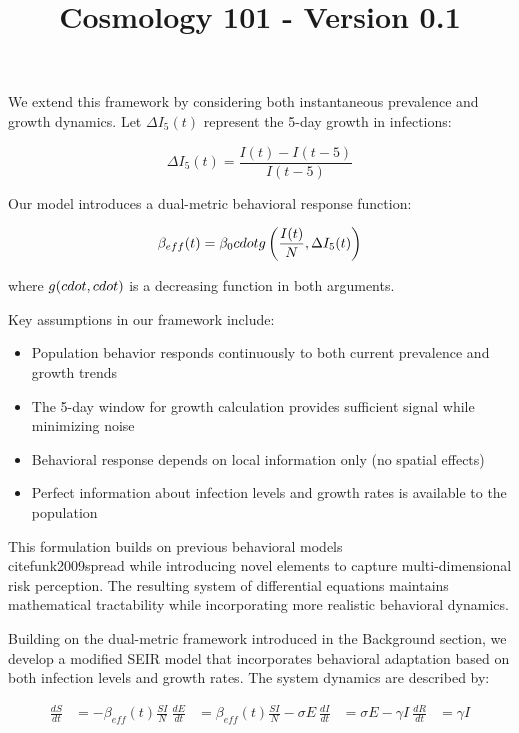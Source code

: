 \documentclass{article}\usepackage{graphicx} \usepackage{amsmath} \usepackage{colortbl}\title{Cosmology 101 - Version 0.1}
\begin{document}
We extend this framework by considering both instantaneous prevalence and growth dynamics. Let $\Delta I_5(t)$ represent the 5-day growth in infections:

\begin{equation}
\Delta I_5(t) = \frac{I(t) - I(t-5)}{I(t-5)}
\end{equation}

Our model introduces a dual-metric behavioral response function:

\begin{equation}
\beta_{eff}(t) = \beta_0 \\cdot g\left(\frac{I(t)}{N}, \Delta I_5(t)\right)
\end{equation}

where $g(\\cdot,\\cdot)$ is a decreasing function in both arguments.

Key assumptions in our framework include:
\begin{itemize}
    \item Population behavior responds continuously to both current prevalence and growth trends
    \item The 5-day window for growth calculation provides sufficient signal while minimizing noise
    \item Behavioral response depends on local information only (no spatial effects)
    \item Perfect information about infection levels and growth rates is available to the population
\end{itemize}

This formulation builds on previous behavioral models \\cite{funk2009spread} while introducing novel elements to capture multi-dimensional risk perception. The resulting system of differential equations maintains mathematical tractability while incorporating more realistic behavioral dynamics.

Building on the dual-metric framework introduced in the Background section, we develop a modified SEIR model that incorporates behavioral adaptation based on both infection levels and growth rates. The system dynamics are described by:

\begin{equation}
\begin{aligned}
\frac{dS}{dt} &= -\beta_{eff}(t)\frac{SI}{N} \
\frac{dE}{dt} &= \beta_{eff}(t)\frac{SI}{N} - \sigma E \
\frac{dI}{dt} &= \sigma E - \gamma I \
\frac{dR}{dt} &= \gamma I
\end{aligned}
\end{equation}
\end{document}
